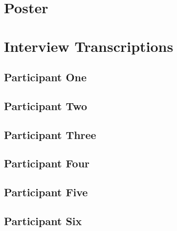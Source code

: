 \chapter{Poster}
\label{appx:poster}




\chapter{Interview Transcriptions}
\label{appx:transcriptions}
\section{Participant One}


\section{Participant Two}


\section{Participant Three}


\section{Participant Four}


\section{Participant Five}


\section{Participant Six}

